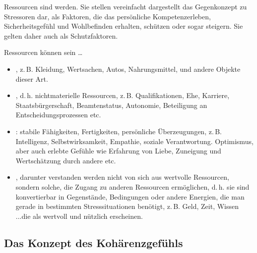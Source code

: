
{Ressourcen sind  werden. Sie stellen
vereinfacht dargestellt das Gegenkonzept zu Stressoren dar,
als Faktoren, die das persönliche Kompetenzerleben,
Sicherheitsgefühl und Wohlbefinden erhalten, schützen oder
sogar steigern. Sie gelten daher auch als Schutzfaktoren.


Ressourcen können sein \ldots
\begin{itemize}
  \item {}, z.\,B. Kleidung, Wertsachen, Autos,
  Nahrungsmittel, und andere Objekte dieser Art.
  \item {}, d.\,h. nichtmaterielle Ressourcen,
  z.\,B. Qualifikationen, Ehe, Karriere, Staatsbürgerschaft,
  Beamtenstatus, Autonomie, Beteiligung an
  Entscheidungsprozessen etc.
  \item {}: stabile Fähigkeiten,
  Fertigkeiten, persönliche Überzeugungen, z.\,B. Intelligenz,
  Selbstwirksamkeit, Empathie, soziale Verantwortung.
  Optimismus, aber auch erlebte Gefühle wie Erfahrung von
  Liebe, Zuneigung und Wertschätzung durch andere etc.
  \item {}, darunter verstanden werden nicht von
  sich aus wertvolle Ressourcen, sondern solche, die Zugang zu
  anderen Ressourcen ermöglichen, d.\,h. sie sind konvertierbar
  in Gegenstände, Bedingungen oder andere Energien, die man
  gerade in bestimmten Stresssituationen benötigt, z.\,B.
  Geld, Zeit, Wissen
  ...die als wertvoll und nützlich erscheinen.
\end{itemize}}
{}
{}
{}
{}



\subsection{Das Konzept des Kohärenzgefühls}

